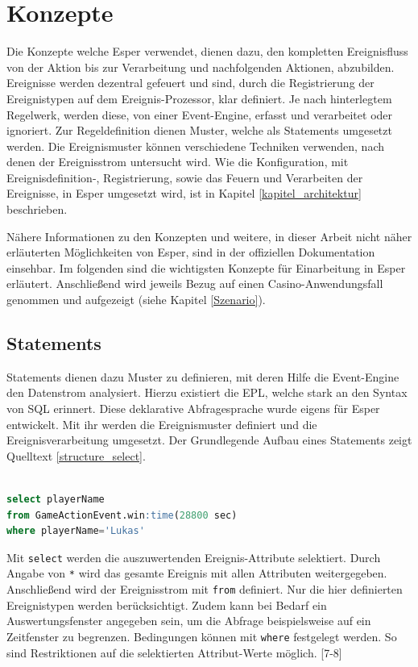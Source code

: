 \chapter{Konzepte}
Die Konzepte welche Esper verwendet, dienen dazu, den kompletten Ereignisfluss von der Aktion bis zur Verarbeitung und nachfolgenden Aktionen, abzubilden.
Ereignisse werden dezentral gefeuert und sind, durch die Registrierung der Ereignistypen auf dem Ereignis-Prozessor, klar definiert. Je nach hinterlegtem Regelwerk, werden diese, von einer Event-Engine, erfasst und verarbeitet oder ignoriert. Zur Regeldefinition dienen Muster, welche als Statements umgesetzt werden. Die Ereignismuster können verschiedene Techniken verwenden, nach denen der Ereignisstrom untersucht wird. 
Wie die Konfiguration, mit Ereignisdefinition-, Registrierung, sowie das Feuern und Verarbeiten der Ereignisse, in Esper umgesetzt wird, ist in Kapitel \ref{kapitel_architektur} beschrieben.

Nähere Informationen zu den Konzepten und weitere, in dieser Arbeit nicht näher erläuterten Möglichkeiten von Esper, sind in der offiziellen Dokumentation \cite{EsperRef2018} einsehbar.
Im folgenden sind die wichtigsten Konzepte für Einarbeitung in Esper erläutert. Anschließend wird jeweils Bezug auf einen Casino-Anwendungsfall genommen und aufgezeigt (siehe Kapitel \ref{Szenario}).

\section{Statements}
\label{statements}
Statements dienen dazu Muster zu definieren, mit deren Hilfe die Event-Engine den Datenstrom analysiert. Hierzu existiert die \acf{EPL}, welche stark an den Syntax von SQL erinnert. Diese deklarative Abfragesprache wurde eigens für Esper entwickelt. Mit ihr werden die Ereignismuster definiert und die Ereignisverarbeitung umgesetzt. Der Grundlegende Aufbau eines Statements zeigt Quelltext \ref{structure_select}.
\begin{lstlisting}[caption={Beispielhafter Aufbau eines Statements },label=structure_select,captionpos=b,language=SQL]

select playerName 
from GameActionEvent.win:time(28800 sec)
where playerName='Lukas'

\end{lstlisting}
Mit \texttt{select} werden die auszuwertenden Ereignis-Attribute selektiert. Durch Angabe von \texttt{*} wird das gesamte Ereignis mit allen Attributen weitergegeben.
Anschließend wird der Ereignisstrom mit \texttt{from} definiert.
Nur die hier definierten Ereignistypen werden berücksichtigt. Zudem kann bei Bedarf ein Auswertungsfenster angegeben sein, um die Abfrage beispielsweise auf ein Zeitfenster zu begrenzen.
Bedingungen können mit \texttt{where} festgelegt werden. So sind Restriktionen auf die selektierten Attribut-Werte möglich.
\cite{EsperRef2018}[7-8]

